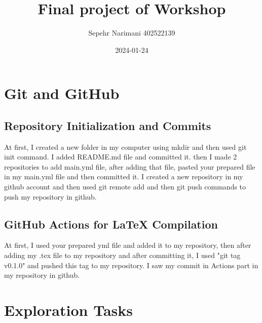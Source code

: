 \documentclass[titlepage]{article}
\title{Final project of Workshop}
\author{Sepehr Narimani 402522139}
\date{2024-01-24}
\begin{document}
	\maketitle
	\tableofcontents
	\newpage
	\pagestyle{fancy}
	\fancyhead[L]{}
	\section{Git and GitHub}
	\subsection{Repository Initialization and Commits}
	At first, I created a new folder in my computer using mkdir and then used git init command. I added README.md file and committed it. then I made 2 repositories to  add main.yml file, after adding that file, pasted your prepared file in my main.yml file and then committed it. I created a new repository in my github account and then used git remote add and then git push commands to push my repository in github.
	\subsection{ GitHub Actions for LaTeX Compilation}
	At first, I used your prepared yml file and added it to my repository, then after adding my .tex file to my repository and after committing it, I used "git tag v0.1.0" and pushed this tag to my repository. I saw my commit in Actions part in my repository in github.
	\section{Exploration Tasks}
\end{document}
